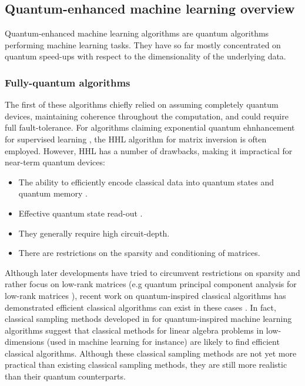 \documentclass[twocolumn, aps, rmp, amsmath, amssymb, nofootinbib, superscriptaddress, longbibliography, floatfix, table-of-contents, eqsecnum]{revtex4}
\begin{document}
\subsection{Quantum-enhanced machine learning overview}

Quantum-enhanced machine learning algorithms are quantum algorithms performing machine learning tasks. They have so far mostly concentrated on quantum speed-ups with respect to the dimensionality of the underlying data.

\subsubsection{Fully-quantum algorithms}

The first of these algorithms chiefly relied on assuming completely quantum devices, maintaining coherence throughout the computation, and could require full fault-tolerance. For algorithms claiming exponential quantum ehnhancement for supervised learning \cite{bib:biamonte2017quantum, bib:ciliberto2018quantum}, the HHL algorithm \cite{bib:harrow2009quantum} for matrix inversion is often employed. However, HHL has a number of drawbacks, making it impractical for near-term quantum devices:
\begin{itemize}
\item The ability to efficiently encode classical data into quantum states and quantum memory \cite{bib:aaronson2015read}.
\item Effective quantum state read-out \cite{bib:aaronson2015read}.
\item They generally require high circuit-depth.
\item There are restrictions on the sparsity and conditioning of matrices.
\end{itemize}

Although later developments have tried to circumvent restrictions on sparsity and rather focus on low-rank matrices (e.g quantum principal component analysis for low-rank matrices \cite{bib:lloyd2014quantum}), recent work on quantum-inspired classical algorithms has demonstrated efficient classical algorithms can exist in these cases \cite{bib:tang2018quantum, bib:gilyen2018quantum, bib:chia2018quantum}. In fact, classical sampling methods developed in \cite{bib:tang2018quantum} for quantum-inspired machine learning algorithms suggest that classical methods for linear algebra problems in low-dimensions (used in machine learning for instance) are likely to find efficient classical algorithms. Although these classical sampling methods are not yet more practical than existing classical sampling methods, they are still more realistic than their quantum counterparts.
\end{document}
